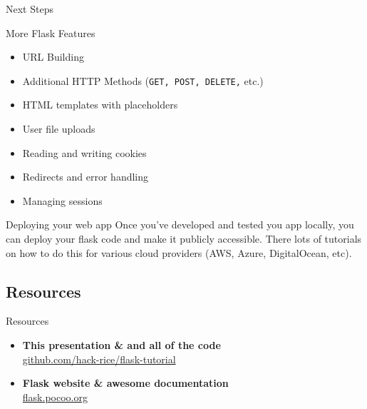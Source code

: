 \documentclass{beamer}
\begin{document}
	\begin{frame}[t]{Next Steps}
		\begin{block}{More Flask Features}
			\begin{itemize}
				\item{URL Building}
				\item{Additional HTTP Methods (\texttt{GET, POST, DELETE,} etc.)}
				\item{HTML templates with placeholders}
				\item{User file uploads}
				\item{Reading and writing cookies}
				\item{Redirects and error handling}
				\item{Managing sessions}
			\end{itemize}
		\end{block}
		\pause

		\begin{block}{Deploying your web app}
			Once you've developed and tested you app locally, you can deploy
			your flask code and make it publicly accessible. There lots of
			tutorials on how to do this for various cloud providers (AWS,
			Azure, DigitalOcean, etc).
		\end{block}
	\end{frame}


\subsection{Resources}
	\begin{frame}[t]{Resources}
		\begin{itemize}
			\item{
				\textbf{This presentation \& and all of the code}\\
				\indent \url{github.com/hack-rice/flask-tutorial}
			}
			\item{
				\textbf{Flask website \& awesome documentation}\\
				\indent \url{flask.pocoo.org}
			}
		\end{itemize}
	\end{frame}
\end{document}
